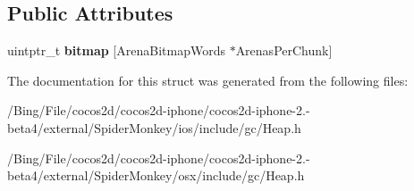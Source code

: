 \subsection*{Public Attributes}
\begin{DoxyCompactItemize}
\item 
\hypertarget{structjs_1_1gc_1_1_chunk_bitmap_af294d908dd87b0039c4172c87b0b99de}{uintptr\-\_\-t {\bfseries bitmap} \mbox{[}Arena\-Bitmap\-Words $\ast$Arenas\-Per\-Chunk\mbox{]}}\label{structjs_1_1gc_1_1_chunk_bitmap_af294d908dd87b0039c4172c87b0b99de}

\end{DoxyCompactItemize}


The documentation for this struct was generated from the following files\-:\begin{DoxyCompactItemize}
\item 
/\-Bing/\-File/cocos2d/cocos2d-\/iphone/cocos2d-\/iphone-\/2.-\/beta4/external/\-Spider\-Monkey/ios/include/gc/Heap.\-h\item 
/\-Bing/\-File/cocos2d/cocos2d-\/iphone/cocos2d-\/iphone-\/2.-\/beta4/external/\-Spider\-Monkey/osx/include/gc/Heap.\-h\end{DoxyCompactItemize}
